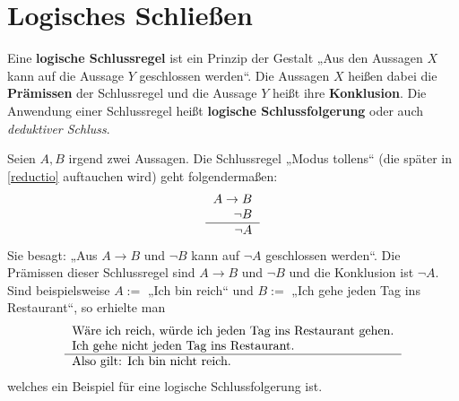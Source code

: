 %                                                                 
%
%
%



\section{Logisches Schließen}



\begin{de}
Eine \textbf{logische Schlussregel} ist ein Prinzip der Gestalt „Aus den Aussagen $X$ kann auf die Aussage $Y$ geschlossen werden“. Die Aussagen $X$ heißen dabei die \textbf{Prämissen} der Schlussregel und die Aussage $Y$ heißt ihre \textbf{Konklusion}. Die Anwendung einer Schlussregel heißt \textbf{logische Schlussfolgerung} oder auch \emph{deduktiver Schluss}.
\end{de}


\begin{bsp}
Seien $A,B$ irgend zwei Aussagen. Die Schlussregel „Modus tollens“ (die später in \cref{reductio} auftauchen wird) geht folgendermaßen:
\[ \begin{tabular}{r}
    $A\to B$ \\
    $\neg B$ \\
    \hline
    $\neg A$
   \end{tabular} \]
 Sie besagt: „Aus $A\to B$ und $\neg B$ kann auf $\neg A$ geschlossen werden“. Die Prämissen dieser Schlussregel sind $A\to B$ und $\neg B$ und die Konklusion ist $\neg A$. \\[0.5em]
  Sind beispielsweise $A:=$ „Ich bin reich“ und $B:=$ „Ich gehe jeden Tag ins Restaurant“, so erhielte man
  \[ \begin{tabular}{l}
Wäre ich reich, würde ich jeden Tag ins Restaurant gehen. \\
Ich gehe nicht jeden Tag ins Restaurant. \\
    \hline
Also gilt: Ich bin nicht reich.
   \end{tabular} \] 
   welches ein Beispiel für eine logische Schlussfolgerung ist.
\end{bsp}





